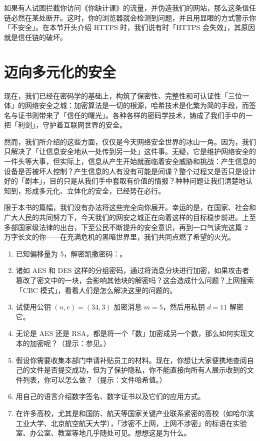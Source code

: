 如果有人试图拦截你访问《你缺计课》的流量，并伪造我们的网站，那么这条信任链必然在某处断开。这时，你的浏览器就会检测到问题，并且用显眼的方式警示你「不安全」。在本节开头介绍 HTTPS 时，我们说有时「HTTPS 会失效」，其原因就是信任链的破坏。

\section{迈向多元化的安全}

现在，我们已经在密码学的基础上，构筑了保密性、完整性和可认证性「三位一体」的网络安全之城：加密算法是一切的根源，哈希技术是化繁为简的手段，而签名与证书则带来了「信任的曙光」。各种各样的密码学技术，铸成了我们手中的一把「利剑」，守护着互联网世界的安全。

然而，我们所介绍的这些方面，仅仅是今天网络安全世界的冰山一角。因为，我们只解决了「让信息安全地从一处传到另一处」这件事。无疑，它是维护网络安全的一件头等大事，但实际上，信息从产生开始就面临着安全威胁和挑战：产生信息的设备是否被坏人控制？产生信息的人有没有可能是间谍？整个过程又是否只是设计好的「剧本」，目的只是从我们手中套取有价值的情报？种种问题让我们清楚地认知到，形成多元化、立体化的安全，已经势在必行。

限于本书的篇幅，我们没有办法将这些完全向你展开。幸运的是，在国家、社会和广大人民的共同努力下，今天我们的网安之城正在向着这样的目标稳步前进。上至多部国家级法律的出台，下至公民不断提升的安全意识，再到一口气读完这篇 2 万字长文的你——在充满危机的黑暗世界里，我们共同点燃了希望的火光。

\practice

\begin{enumerate}
  \item 已知偏移量为 5，解密凯撒密码：。
  \item 诸如 AES 和 DES 这样的分组密码，通过将消息分块进行加密，如果攻击者篡改了密文中的一块，会影响其他块的解密吗？这会造成什么问题？上网搜索「CBC 模式」，看看人们是怎么解决这里的问题的。
  \item 试使用公钥 $(n,e)=(34, 3)$ 加密消息 $m=5$，然后用私钥 $d=11$ 解密它。
  \item 无论是 AES 还是 RSA，都是将一个「数」加密成另一个数，那么如何实现文本的加密呢？（提示：参见。）
  \item 假设你需要收集本部门申请补贴员工的材料。现在，你想让大家便携地查阅自己的文件是否提交成功，但为了保护隐私，你不能直接向所有人展示收到的文件列表，你可以怎么做？（提示：文件哈希值。）
  \item 用自己的语言介绍数字签名、数字证书以及它们的应用方式。
  \item 在许多高校，尤其是和国防、航天等国家关键产业联系紧密的高校（如哈尔滨工业大学、北京航空航天大学），「涉密不上网，上网不涉密」的标语在实验室、办公室、教室等地几乎随处可见。想想这是为什么。
\end{enumerate}
